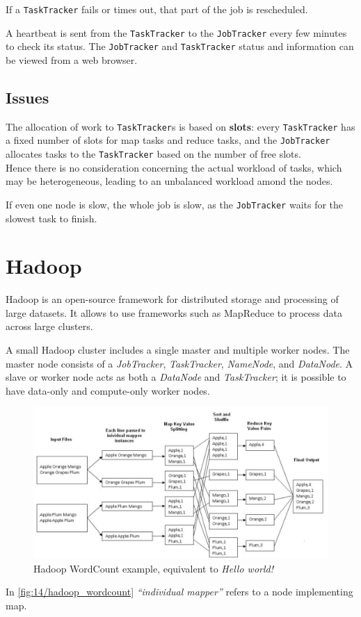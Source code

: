 If a \texttt{TaskTracker} fails or times out, that part of the job is rescheduled.

A heartbeat is sent from the \texttt{TaskTracker} to the \texttt{JobTracker} every few minutes to check its status. The
\texttt{JobTracker} and \texttt{TaskTracker} status and information can be viewed from a web browser.

\subsection{Issues}
The allocation of work to \texttt{TaskTracker}s is based on \textbf{slots}:
every \texttt{TaskTracker} has a fixed number of slots for map tasks and reduce tasks, and the \texttt{JobTracker} allocates tasks to the \texttt{TaskTracker} based on the number of free slots.\\
Hence there is no consideration concerning the actual workload of tasks, which may be heterogeneous, leading to an unbalanced workload amond the nodes.

If even one node is slow, the whole job is slow, as the \texttt{JobTracker} waits for the slowest task to finish.

\section{Hadoop}
Hadoop is an open-source framework for distributed storage and processing of large datasets. It allows to use frameworks such as MapReduce to process data across large clusters.

A small Hadoop cluster includes a single master and
multiple worker nodes.
The master node consists of a \textit{JobTracker}, \textit{TaskTracker},
\textit{NameNode}, and \textit{DataNode}.
A slave or worker node acts as both a \textit{DataNode} and
\textit{TaskTracker}; it is possible to have data-only and compute-only worker nodes.

\begin{figure}[htbp]
   \centering
   \includegraphics{images/14/hadoop_wordcount.png}
   \caption{Hadoop WordCount example, equivalent to \textit{Hello world!}}
   \label{fig:14/hadoop_wordcount}
\end{figure}
 In \autoref{fig:14/hadoop_wordcount} \textit{``individual mapper''} refers to a node implementing map.

